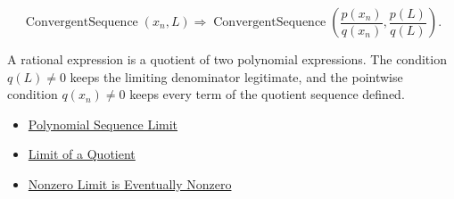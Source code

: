 \begin{remark*}
\[
\operatorname{ConvergentSequence}(x_n,L)
\Longrightarrow
\operatorname{ConvergentSequence}
\left(\frac{p(x_n)}{q(x_n)},\frac{p(L)}{q(L)}\right).
\]
\end{remark*}

\begin{remark*}[Interpretation]
A rational expression is a quotient of two polynomial expressions. The
condition $q(L)\neq 0$ keeps the limiting denominator legitimate, and the
pointwise condition $q(x_n)\neq 0$ keeps every term of the quotient sequence
defined.
\end{remark*}

\begin{dependencies}
\begin{itemize}
  \item \hyperref[thm:polynomial-sequence-limit]{Polynomial Sequence Limit}
  \item \hyperref[thm:limit-of-a-quotient]{Limit of a Quotient}
  \item \hyperref[thm:nonzero-limit-eventually-nonzero]{Nonzero Limit is Eventually Nonzero}
\end{itemize}
\end{dependencies}

